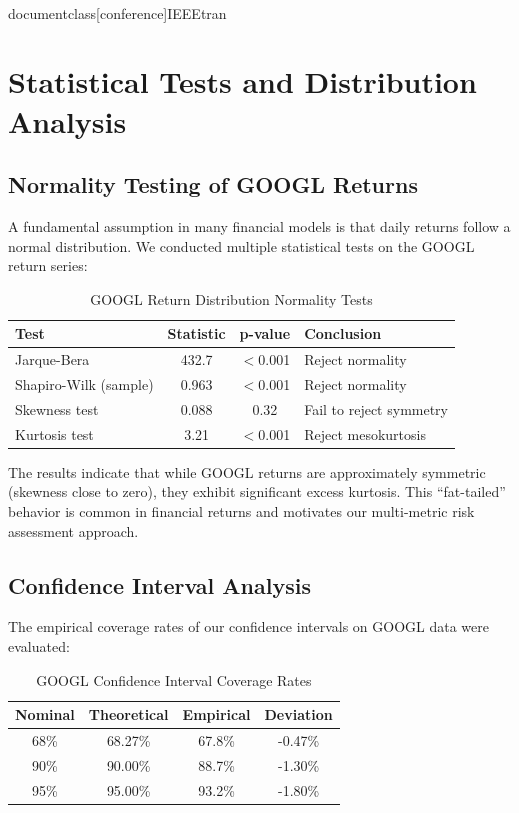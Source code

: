 \\documentclass[conference]{IEEEtran}
\begin{document}
\section{Statistical Tests and Distribution Analysis}

\subsection{Normality Testing of GOOGL Returns}
A fundamental assumption in many financial models is that daily returns follow a normal distribution. We conducted multiple statistical tests on the GOOGL return series:

\begin{table}[H]
\caption{GOOGL Return Distribution Normality Tests}
\begin{center}
\begin{tabular}{|l|c|c|l|}
\hline
\textbf{Test} & \textbf{Statistic} & \textbf{p-value} & \textbf{Conclusion} \\
\hline
Jarque-Bera & 432.7 & $<$0.001 & Reject normality \\
\hline
Shapiro-Wilk (sample) & 0.963 & $<$0.001 & Reject normality \\
\hline
Skewness test & 0.088 & 0.32 & Fail to reject symmetry \\
\hline
Kurtosis test & 3.21 & $<$0.001 & Reject mesokurtosis \\
\hline
\end{tabular}
\label{tab:googl_normality}
\end{center}
\end{table}

The results indicate that while GOOGL returns are approximately symmetric (skewness close to zero), they exhibit significant excess kurtosis. This ``fat-tailed'' behavior is common in financial returns and motivates our multi-metric risk assessment approach.

\subsection{Confidence Interval Analysis}
The empirical coverage rates of our confidence intervals on GOOGL data were evaluated:

\begin{table}[H]
\caption{GOOGL Confidence Interval Coverage Rates}
\begin{center}
\begin{tabular}{|c|c|c|c|}
\hline
\textbf{Nominal} & \textbf{Theoretical} & \textbf{Empirical} & \textbf{Deviation} \\
\hline
68\% & 68.27\% & 67.8\% & -0.47\% \\
\hline
90\% & 90.00\% & 88.7\% & -1.30\% \\
\hline
95\% & 95.00\% & 93.2\% & -1.80\% \\
\hline
\end{tabular}
\label{tab:googl_ci_coverage}
\end{center}
\end{table}
\end{document}
